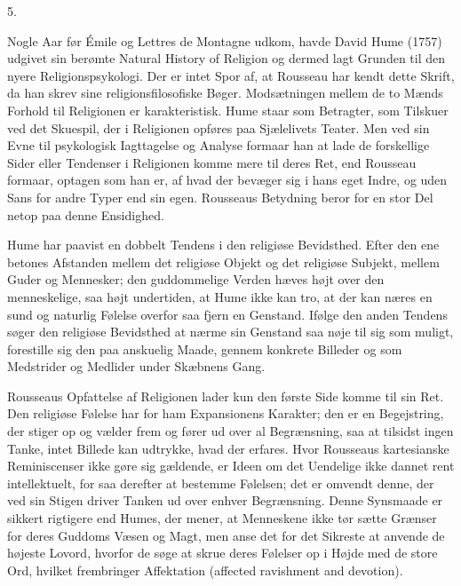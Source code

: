\documentclass[12pt,a4paper,openany]{book}
\newcommand{\opage}[1]{\marginnote{\footnotesize\textit{[#1]}}}
\begin{document}
\begin{center}5.\end{center}

Nogle Aar før Émile og Lettres de Montagne udkom, havde
David Hume (1757) udgivet sin berømte Natural History of
Religion og dermed lagt Grunden til den nyere Religionspsykologi.
Der er intet Spor af, at Rousseau har kendt dette Skrift,
da han skrev sine religionsfilosofiske Bøger. Modsætningen
mellem de to Mænds Forhold til Religionen er karakteristisk.
Hume staar som Betragter, som Tilskuer ved det Skuespil, der
i Religionen opføres paa Sjælelivets Teater. Men ved sin Evne
til psykologisk Iagttagelse og Analyse formaar han at lade de
forskellige Sider eller Tendenser i Religionen komme mere til
deres Ret, end Rousseau formaar, optagen som han er, af hvad
der bevæger sig i hans eget Indre, og uden Sans for andre
Typer end sin egen. Rousseaus Betydning beror for en stor
Del netop paa denne Ensidighed.

Hume har paavist en dobbelt Tendens i den religiøse Bevidsthed.
Efter den ene betones Afstanden mellem det religiøse
Objekt og det religiøse Subjekt, mellem Guder og Mennesker;
den guddommelige Verden hæves højt over den menneskelige,
saa højt undertiden, at Hume ikke kan tro, at der kan næres
en sund og naturlig Følelse overfor saa fjern en Genstand.
Ifølge den anden Tendens søger den religiøse Bevidsthed at
nærme sin Genstand saa nøje til sig som muligt, forestille sig
\setcounter{footnote}{0}%
\opage{160}den paa anskuelig Maade, gennem konkrete Billeder og som
Medstrider og Medlider under Skæbnens Gang.

Rousseaus Opfattelse af Religionen lader kun den første
Side komme til sin Ret. Den religiøse Følelse har for ham
Expansionens Karakter; den er en Begejstring, der stiger op
og vælder frem og fører ud over al Begrænsning, saa at tilsidst
ingen Tanke, intet Billede kan udtrykke, hvad der erfares. Hvor
Rousseaus kartesianske Reminiscenser ikke gøre sig gældende,
er Ideen om det Uendelige ikke dannet rent intellektuelt, for
saa derefter at bestemme Følelsen; det er omvendt denne, der
ved sin Stigen driver Tanken ud over enhver Begrænsning.
Denne Synsmaade er sikkert rigtigere end Humes, der mener,
at Menneskene ikke tør sætte Grænser for deres Guddoms
Væsen og Magt, men anse det for det Sikreste at anvende de
højeste Lovord, hvorfor de søge at skrue deres Følelser op i
Højde med de store Ord, hvilket frembringer Affektation (affected
ravishment and devotion).
\end{document}
